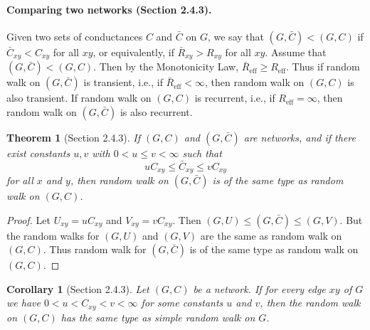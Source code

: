 \documentclass[UTF8,11pt]{ctexart}
\newtheorem*{theorem}{Theorem}
\newtheorem*{corollary}{Corollary}
\theoremstyle{definition}
\begin{document}
\paragraph{Comparing two networks (Section 2.4.3).}
Given two sets of conductances $C$ and $\bar C$ on $G$, we say that $(G,\bar C)<(G,C)$ if $\bar C_{xy}<C_{xy}$ for all $xy$, or equivalently, if $\bar R_{xy}>R_{xy}$ for all $xy$. Assume that $(G,\bar C)<(G,C)$. Then by the Monotonicity Law, $\bar R_{\mathrm{eff}}\ge R_{\mathrm{eff}}$. Thus if random walk on $(G,\bar C)$ is transient, i.e., if $\bar R_{\mathrm{eff}}<\infty$, then random walk on $(G,C)$ is also transient. If random walk on $(G,C)$ is recurrent, i.e., if $R_{\mathrm{eff}}=\infty$, then random walk on $(G,\bar C)$ is also recurrent.
\begin{theorem}[Section 2.4.3]
If $(G,C)$ and $(G,\bar C)$ are networks, and if there exist constants $u,v$ with $0<u\le v<\infty$ such that
\[
uC_{xy}\le\bar C_{xy}\le vC_{xy}
\]
for all $x$ and $y$, then random walk on $(G,\bar C)$ is of the same type as random walk on $(G,C)$.
\end{theorem}
\begin{proof}
Let $U_{xy}=uC_{xy}$ and $V_{xy}=vC_{xy}$. Then $(G,U)\le(G,\bar C)\le(G,V)$. But the random walks for $(G,U)$ and $(G,V)$ are the same as random walk on $(G,C)$. Thus random walk for $(G,\bar C)$ is of the same type as random walk on $(G,C)$.
\end{proof}
\begin{corollary}[Section 2.4.3]
Let $(G,C)$ be a network. If for every edge $xy$ of $G$ we have $0<u<C_{xy}<v<\infty$ for some constants $u$ and $v$, then the random walk on $(G,C)$ has the same type as simple random walk on $G$.
\end{corollary}
\end{document}
